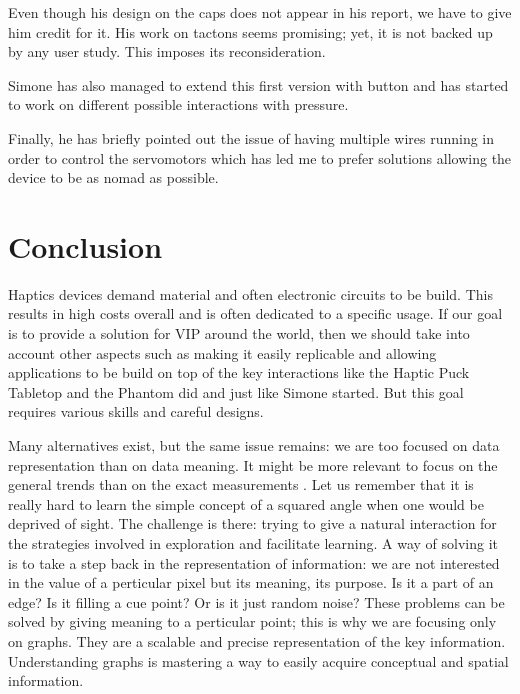 Even though his design on the caps does not appear in his report, we
have to give him credit for it. His work on tactons seems promising;
yet, it is not backed up by any user study. This imposes its
reconsideration.

Simone has also managed to extend this first version with button and has
started to work on different possible interactions with pressure.

Finally, he has briefly pointed out the issue of having multiple wires
running in order to control the servomotors which has led me to prefer
solutions allowing the device to be as nomad as possible.

\section{Conclusion}\label{conclusion}

Haptics devices demand material and often electronic circuits to be
build. This results in high costs overall and is often dedicated to a
specific usage. If our goal is to provide a solution for VIP around the
world, then we should take into account other aspects such as making it
easily replicable and allowing applications to be build on top of the
key interactions like the Haptic Puck Tabletop and the Phantom did and just like Simone started. But
this goal requires various skills and careful designs.

Many alternatives exist, but the same issue remains: we are too focused
on data representation than on data meaning. It might be more relevant to
focus on the general trends than on the exact measurements \cite{roberts2007we}. Let us
remember that it is really hard to learn the simple concept of a squared
angle when one would be deprived of sight. The challenge is there:
trying to give a natural interaction for the strategies involved in
exploration and facilitate learning. A way of solving it is to take a
step back in the representation of information: we are not interested in
the value of a perticular pixel but its meaning, its purpose. Is it a
part of an edge? Is it filling a cue point? Or is it just random noise?
These problems can be solved by giving meaning to a perticular point; this
is why we are focusing only on graphs. They are a scalable and precise
representation of the key information. Understanding graphs is mastering
a way to easily acquire conceptual and spatial information.